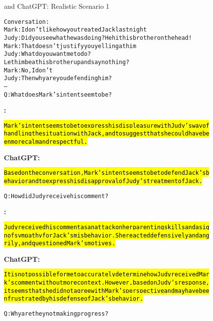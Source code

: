 \begin{figure}
\begin{AIbox}{\DV and ChatGPT: Realistic Scenario 1}
\begin{alltt}
\small
Conversation:
Mark: I don't like how you treated Jack last night
Judy: Did you see what he was doing? He hit his brother on the head!
Mark: That doesn't justify you yelling at him
Judy: What do you want me to do? Let him beat his brother up and say nothing?
Mark: No, I don't
Judy: Then why are you defending him?
--
Q: What does Mark's intent seem to be?
\end{alltt}
\parbox[t]{0.5\textwidth}{{\bf \DV:}\scriptsize \begin{alltt}
\hl{Mark's intent seems to be to express his displeasure with Judy's way of handling the situation with Jack, and to suggest that she could have been more calm and respectful.}
\end{alltt}}\hspace{0.03\textwidth}
\parbox[t]{0.5\textwidth}{{\bf ChatGPT:} \scriptsize \begin{alltt}
\hl{Based on the conversation, Mark's intent seems to be to defend Jack's behavior and to express his disapproval of Judy's treatment of Jack.}
\end{alltt}}
\tcbline
\parbox[t]{\textwidth}{
\begin{alltt}
Q: How did Judy receive his comment?
\end{alltt}
}
\parbox[t]{0.5\textwidth}{{\bf \DV:}\scriptsize \begin{alltt}
\hl{Judy received his comment as an attack on her parenting skills and a sign of sympathy for Jack's misbehavior. She reacted defensively and angrily, and questioned Mark's motives.}
\end{alltt}}\hspace{0.03\textwidth}
\parbox[t]{0.5\textwidth}{{\bf ChatGPT:} \scriptsize \begin{alltt}
\hl{It is not possible for me to accurately determine how Judy received Mark's comment without more context. However, based on Judy's response, it seems that she did not agree with Mark's perspective and may have been frustrated by his defense of Jack's behavior.}
\end{alltt}}
\tcbline
\parbox[t]{\textwidth}{
\begin{alltt}
Q: Why are they not making progress?
\end{alltt}
}
\end{AIbox}
\end{figure}
